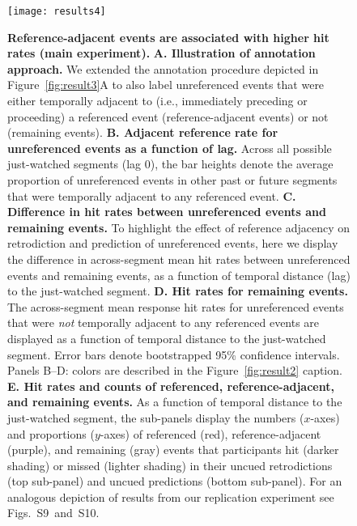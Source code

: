 \documentclass[10pt]{article}
\newcommand{\refAdjacent}{S9}
\newcommand{\refAdjacentCorrected}{S10}
\begin{document}
\begin{figure}[tp]
  \centering
  \texttt{[image: results4]}

  \caption{\textbf{Reference-adjacent events are associated with higher hit rates (main experiment).} \textbf{A. Illustration of annotation approach.} We extended the annotation procedure depicted in Figure~\ref{fig:result3}A to also label unreferenced events that were either temporally adjacent to (i.e., immediately preceding or proceeding) a referenced event (reference-adjacent events) or not (remaining events). \textbf{B. Adjacent reference rate for unreferenced events as a function of lag.} Across all possible just-watched segments (lag 0), the bar heights denote the average proportion of unreferenced events in other past or future segments that were temporally adjacent to any referenced event. \textbf{C. Difference in hit rates between unreferenced events and remaining events.} To highlight the effect of reference adjacency on retrodiction and prediction of unreferenced events, here we display the difference in across-segment mean hit rates between unreferenced events and remaining events, as a function of temporal distance (lag) to the just-watched segment. \textbf{D. Hit rates for remaining events.} The across-segment mean response hit rates for unreferenced events that were \textit{not} temporally adjacent to any referenced events are displayed as a function of temporal distance to the just-watched segment. Error bars denote bootstrapped 95\% confidence intervals. Panels B--D: colors are described in the Figure~\ref{fig:result2} caption. \textbf{E. Hit rates and counts of referenced, reference-adjacent, and remaining events.} As a function of temporal distance to the just-watched segment, the sub-panels display the numbers ($x$-axes) and proportions ($y$-axes) of referenced (red), reference-adjacent (purple), and remaining (gray) events that participants hit (darker shading) or missed (lighter shading) in their uncued retrodictions (top sub-panel) and uncued predictions (bottom sub-panel). For an analogous depiction of results from our replication experiment see Figs.~\refAdjacent~and~\refAdjacentCorrected.}

  \label{fig:result4}
\end{figure}
\end{document}
